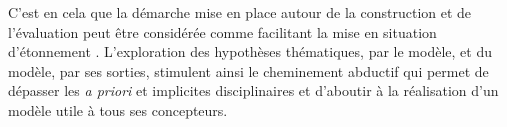C'est en cela que la démarche mise en place autour de la construction et de l'évaluation peut être considérée comme facilitant la \og mise en situation d'étonnement\fg{} \autocite[241]{banos2005voie}.
L'exploration des hypothèses thématiques, par le modèle, et du modèle, par ses sorties, stimulent ainsi le cheminement abductif qui permet de dépasser les \textit{a priori} et implicites disciplinaires et d'aboutir à la réalisation d'un modèle utile à tous ses concepteurs.